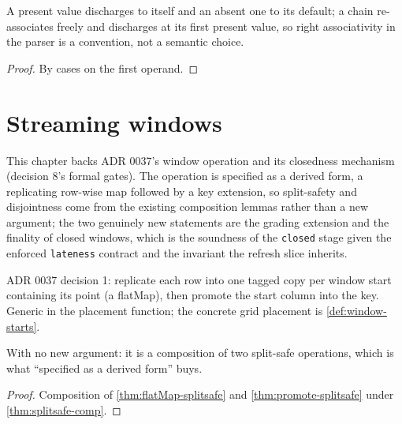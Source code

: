 \begin{theorem}
  \label{thm:coalesce-laws}
  \leanok
  A present value discharges to itself and an absent one to its
  default; a chain re-associates freely and discharges at its first
  present value, so right associativity in the parser is a convention,
  not a semantic choice.
\end{theorem}
\begin{proof}\leanok
  By cases on the first operand.
\end{proof}

\chapter{Streaming windows}

This chapter backs ADR 0037's window operation and its closedness
mechanism (decision 8's formal gates).  The operation is specified as a
derived form, a replicating row-wise map followed by a key extension, so
split-safety and disjointness come from the existing composition lemmas
rather than a new argument; the two genuinely new statements are the
grading extension and the finality of closed windows, which is the
soundness of the \texttt{closed} stage given the enforced
\texttt{lateness} contract and the invariant the refresh slice inherits.

\begin{definition}[Window]
  \label{def:window}\leanok
  ADR 0037 decision 1: replicate each row into one tagged copy per
  window start containing its point (a flatMap), then promote the start
  column into the key.  Generic in the placement function; the concrete
  grid placement is \ref{def:window-starts}.
\end{definition}

\begin{theorem}
  \label{thm:window-splitsafe}\leanok
  With no new argument: it is a composition of two split-safe
  operations, which is what ``specified as a derived form'' buys.
\end{theorem}
\begin{proof}\leanok
  Composition of \ref{thm:flatMap-splitsafe} and
  \ref{thm:promote-splitsafe} under \ref{thm:splitsafe-comp}.
\end{proof}

